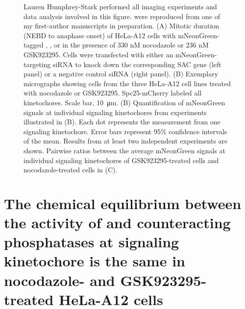 \begin{figure}
    \noindent\justifying Lauren Humphrey-Stark performed all imaging experiments and data analysis involved in this figure.  were reproduced from one of my first-author manuscripts in preparation. (A) Mitotic duration (NEBD to anaphase onset) of HeLa-A12 cells with  mNeonGreen-tagged , , or  in the presence of 330 nM nocodazole or 236 nM GSK923295. Cells were transfected with either an mNeonGreen-targeting siRNA to knock down the corresponding SAC gene (left panel) or a negative control siRNA (right panel). (B) Exemplary micrographs showing cells from the three HeLa-A12 cell lines treated with nocodazole or GSK923295. Spc25-mCherry labeled all kinetochores. Scale bar, \SI{10}{\micro m}. (B) Quantification of mNeonGreen signals at individual signaling kinetochores from experiments illustrated in (B). Each dot represents the measurement from one signaling kinetochore. Error bars represent 95\% confidence intervals of the mean. Results from at least two independent experiments are shown. Pairwise ratios between the average mNeonGreen signals at individual signaling kinetochores of GSK923295-treated cells and nocodazole-treated cells in (C).
\label{SACProteinKinetochoreRecruitment}
\end{figure}


\section{The chemical equilibrium between the activity of  and counteracting phosphatases at signaling kinetochore is the same in nocodazole- and GSK923295-treated HeLa-A12 cells}

